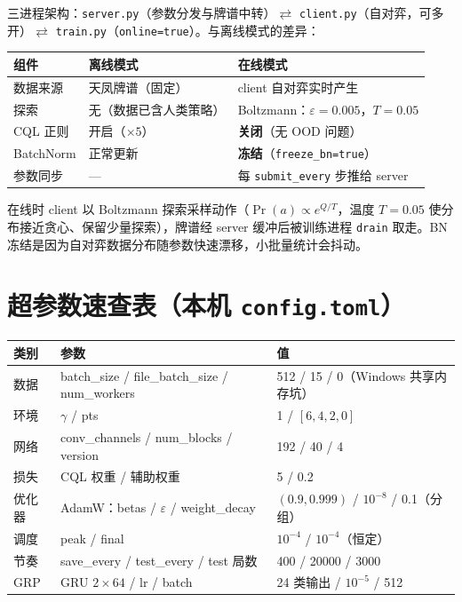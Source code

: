\documentclass[11pt,a4paper]{ctexart}
\theoremstyle{remark}
\begin{document}
三进程架构：\texttt{server.py}（参数分发与牌谱中转）$\rightleftarrows$ \texttt{client.py}（自对弈，可多开）$\rightleftarrows$ \texttt{train.py}（\texttt{online=true}）。与离线模式的差异：

\begin{center}
\small
\setlength{\tabcolsep}{4.5pt}
\begin{tabular}{l p{4.9cm} p{6.3cm}}
  \toprule
  组件 & 离线模式 & 在线模式 \\
  \midrule
  数据来源 & 天凤牌谱（固定） & client 自对弈实时产生 \\
  探索 & 无（数据已含人类策略） & Boltzmann：$\varepsilon = 0.005$，$T = 0.05$ \\
  CQL 正则 & 开启（$\times 5$） & \textbf{关闭}（无 OOD 问题） \\
  BatchNorm & 正常更新 & \textbf{冻结}（\texttt{freeze\_bn=true}） \\
  参数同步 & --- & 每 \texttt{submit\_every} 步推给 server \\
  \bottomrule
\end{tabular}
\end{center}

在线时 client 以 Boltzmann 探索采样动作（$\Pr(a) \propto e^{Q/T}$，温度 $T = 0.05$ 使分布接近贪心、保留少量探索），牌谱经 server 缓冲后被训练进程 \texttt{drain} 取走。BN 冻结是因为自对弈数据分布随参数快速漂移，小批量统计会抖动。

\section{超参数速查表（本机 \texttt{config.toml}）}

\begin{center}
\small
\setlength{\tabcolsep}{4.5pt}
\begin{tabular}{lll}
  \toprule
  类别 & 参数 & 值 \\
  \midrule
  数据 & batch\_size / file\_batch\_size / num\_workers & 512 / 15 / 0（Windows 共享内存坑） \\
  环境 & $\gamma$ / pts & 1 / $[6,4,2,0]$ \\
  网络 & conv\_channels / num\_blocks / version & 192 / 40 / 4 \\
  损失 & CQL 权重 / 辅助权重 & 5 / 0.2 \\
  优化器 & AdamW：betas / $\varepsilon$ / weight\_decay & $(0.9, 0.999)$ / $10^{-8}$ / 0.1（分组） \\
  调度 & peak / final & $10^{-4}$ / $10^{-4}$（恒定） \\
  节奏 & save\_every / test\_every / test 局数 & 400 / 20000 / 3000 \\
  GRP & GRU $2\times64$ / lr / batch & 24 类输出 / $10^{-5}$ / 512 \\
  \bottomrule
\end{tabular}
\end{center}
\end{document}
